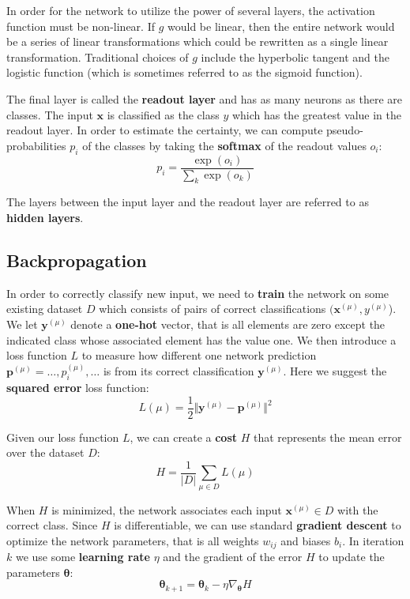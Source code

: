 In order for the network to utilize the power of several layers, the activation function must be non-linear. If $g$ would be linear, then the entire network would be a series of linear transformations which could be rewritten as a single linear transformation. Traditional choices of $g$ include the hyperbolic tangent and the logistic function (which is sometimes referred to as the sigmoid function).

The final layer is called the \textbf{readout layer} and has as many neurons as there are classes. The input $\mathbf{x}$ is classified as the class $y$ which has the greatest value in the readout layer. In order to estimate the certainty, we can compute pseudo-probabilities $p_i$ of the classes by taking the \textbf{softmax} of the readout values $o_i$:
\[
p_i = \frac{ \exp(o_i) }{ \sum_k \exp(o_k) }
\]

The layers between the input layer and the readout layer are referred to as \textbf{hidden layers}.

\subsection{Backpropagation} \label{sssec:BackProp}

In order to correctly classify new input, we need to \textbf{train} the network on some existing dataset $D$ which consists of pairs of correct classifications $(\mathbf{x}^{(\mu)}, y^{(\mu)}$).
We let $\mathbf{y}^{(\mu)}$ denote a \textbf{one-hot} vector, that is all elements are zero except the indicated class whose associated element has the value one.
We then introduce a loss function $L$ to measure how different one network prediction $\mathbf{p}^{(\mu)}={\ldots, p_i^{(\mu)}, \ldots}$ is from its correct classification $\mathbf{y}^{(\mu)}$. Here we suggest the \textbf{squared error} loss function:
\[
L(\mu) = \frac{1}{2} \Vert
  \mathbf{y}^{(\mu)} - \mathbf{p}^{(\mu)}
\Vert ^2
\]

Given our loss function $L$, we can create a \textbf{cost} $H$ that represents the mean error over the dataset $D$:
\[
H = \frac{1}{\vert D \vert} \sum_{\mu \in D} L(\mu)
\]

When $H$ is minimized, the network associates each input $\mathbf{x}^{(\mu)} \in D$ with the correct class. Since $H$ is differentiable, we can use standard \textbf{gradient descent} to optimize the network parameters, that is all weights $w_{ij}$ and biases $b_i$.
In iteration $k$ we use some \textbf{learning rate} $\eta$ and the gradient of the error $H$ to update the parameters $\mathbf{\theta}$:
\[
\mathbf{\theta}_{k+1} =
\mathbf{\theta}_k - \eta \nabla_{\mathbf{\theta}} H
\]

